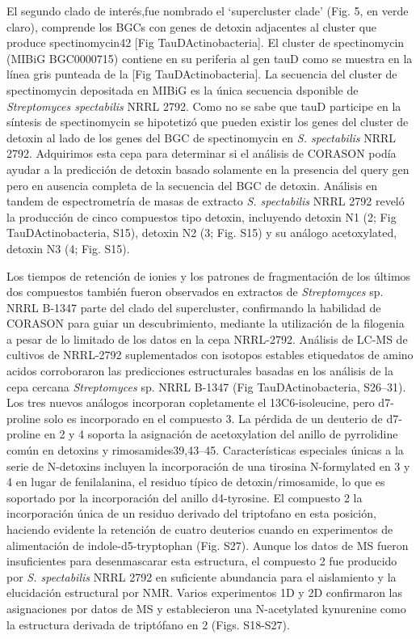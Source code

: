 \documentclass[12pt,twoside]{reedthesis}
\begin{document}
  El segundo clado de interés,fue nombrado el `supercluster clade' (Fig.
  5, en verde claro), comprende los BGCs con genes de detoxin adjacentes
  al cluster que produce spectinomycin42 {[}Fig TauDActinobacteria{]}. El
  cluster de spectinomycin (MIBiG BGC0000715) contiene en su periferia al
  gen tauD como se muestra en la línea gris punteada de la {[}Fig
  TauDActinobacteria{]}. La secuencia del cluster de spectinomycin
  depositada en MIBiG es la única secuencia dsponible de
  \emph{Streptomyces spectabilis} NRRL 2792. Como no se sabe que tauD
  participe en la síntesis de spectinomycin se hipotetizó que pueden
  existir los genes del cluster de detoxin al lado de los genes del BGC de
  spectinomycin en \emph{S. spectabilis} NRRL 2792. Adquirimos esta cepa
  para determinar si el análisis de CORASON podía ayudar a la predicción
  de detoxin basado solamente en la presencia del query gen pero en
  ausencia completa de la secuencia del BGC de detoxin. Análisis en tandem
  de espectrometría de masas de extracto \emph{S. spectabilis} NRRL 2792
  reveló la producción de cinco compuestos tipo detoxin, incluyendo
  detoxin N1 (2; Fig TauDActinobacteria, S15), detoxin N2 (3; Fig. S15) y
  su análogo acetoxylated, detoxin N3 (4; Fig. S15).
  
  Los tiempos de retención de ionies y los patrones de fragmentación de
  los últimos dos compuestos también fueron observados en extractos de
  \emph{Streptomyces} sp. NRRL B-1347 parte del clado del supercluster,
  confirmando la habilidad de CORASON para guiar un descubrimiento,
  mediante la utilización de la filogenia a pesar de lo limitado de los
  datos en la cepa NRRL-2792. Análisis de LC-MS de cultivos de NRRL-2792
  suplementados con isotopos estables etiquedatos de amino acidos
  corroboraron las predicciones estructurales basadas en los análisis de
  la cepa cercana \emph{Streptomyces} sp. NRRL B-1347 (Fig
  TauDActinobacteria, S26--31). Los tres nuevos análogos incorporan
  copletamente el 13C6-isoleucine, pero d7-proline solo es incorporado en
  el compuesto 3. La pérdida de un deuterio de d7-proline en 2 y 4 soporta
  la asignación de acetoxylation del anillo de pyrrolidine común en
  detoxins y rimosamides39,43--45. Características especiales únicas a la
  serie de N-detoxins incluyen la incorporación de una tirosina
  N-formylated en 3 y 4 en lugar de fenilalanina, el residuo típico de
  detoxin/rimosamide, lo que es soportado por la incorporación del anillo
  d4-tyrosine. El compuesto 2 la incorporación única de un residuo
  derivado del triptofano en esta posición, haciendo evidente la retención
  de cuatro deuterios cuando en experimentos de alimentación de
  indole-d5-tryptophan (Fig. S27). Aunque los datos de MS fueron
  insuficientes para desenmascarar esta estructura, el compuesto 2 fue
  producido por \emph{S. spectabilis} NRRL 2792 en suficiente abundancia
  para el aislamiento y la elucidación estructural por NMR. Varios
  experimentos 1D y 2D confirmaron las asignaciones por datos de MS y
  establecieron una N-acetylated kynurenine como la estructura derivada de
  triptófano en 2 (Figs. S18-S27).
  
\end{document}
